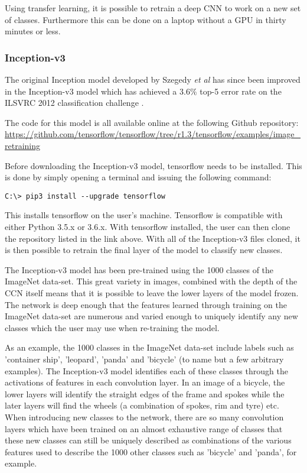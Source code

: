 Using transfer learning, it is possible to retrain a deep CNN to work on a new set of classes. Furthermore this can be done on a laptop without a GPU in thirty minutes or less.

\subsubsection*{Inception-v3}
The original Inception model developed by Szegedy \textit{et al} \parencite*{convolution4} has since been improved in the Inception-v3 model which has achieved a $3.6\%$ top-5 error rate on the ILSVRC 2012 classification challenge \parencite{Inceptionv3}.

The code for this model is all available online at the following Github repository:
\url{https://github.com/tensorflow/tensorflow/tree/r1.3/tensorflow/examples/image_retraining}

Before downloading the Inception-v3 model, tensorflow needs to be installed. This is done by simply opening a terminal and issuing the following command:

\verb|C:\> pip3 install --upgrade tensorflow|

This installs tensorflow on the user's machine. Tensorflow is compatible with either Python 3.5.x or 3.6.x.
With tensorflow installed, the user can then clone the repository listed in the link above. With all of the Inception-v3 files cloned, it is then possible to retrain the final layer of the model to classify new classes.

The Inception-v3 model has been pre-trained using the 1000 classes of the ImageNet data-set. This great variety in images, combined with the depth of the CCN itself means that it is possible to leave the lower layers of the model frozen. The network is deep enough that the features learned through training on the ImageNet data-set are numerous and varied enough to uniquely identify any new classes which the user may use when re-training the model.

As an example, the 1000 classes in the ImageNet data-set include labels such as 'container ship', 'leopard', 'panda' and 'bicycle' (to name but a few arbitrary examples). The Inception-v3 model identifies each of these classes through the activations of features in each convolution layer. In an image of a bicycle, the lower layers will identify the straight edges of the frame and spokes while the later layers will find the wheels (a combination of spokes, rim and tyre) etc. When introducing new classes to the network, there are so many convolution layers which have been trained on an almost exhaustive range of classes that these new classes can still be uniquely described as combinations of the various features used to describe the 1000 other classes such as 'bicycle' and 'panda', for example.

